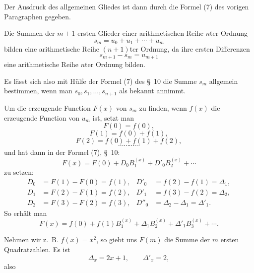 

Der Ausdruck des allgemeinen Gliedes ist dann durch die Formel (7) des vorigen Paragraphen gegeben.

Die Summen der \(m+1\) ersten Glieder einer arithmetischen Reihe \(n\)ter Ordnung
\[
s_m=u_0+u_1+\cdots+u_m
\]
bilden eine arithmetische Reihe \((n+1)\)ter Ordnung, da ihre ersten Differenzen
\[
s_{m+1}-s_m=u_{m+1}
\]
eine arithmetische Reihe \(n\)ter Ordnung bilden.

Es lässt sich also mit Hülfe der Formel (7) des \S~10 die Summe \(s_m\) allgemein bestimmen, wenn man \(s_0,s_1,\ldots,s_{n+1}\) als bekannt annimmt.

Um die erzeugende Function \(F(x)\) von \(s_m\) zu finden, wenn \(f(x)\) die erzeugende Function von \(u_m\) ist, setzt man
\[
F(0)=f(0),
\]
\[
F(1)=f(0)+f(1),
\]
\[
F(2)=f(0)+f(1)+f(2),
\]
\[
\cdots\cdots\cdots\cdots
\]
und hat dann in der Formel (7), \S~10:
\[
F(x)=F(0)+D_0B_1^{(x)}+D'_0B_2^{(x)}+\cdots
\]
zu setzen:
\[
\begin{aligned}
D_0&=F(1)-F(0)=f(1),&
D'_0&=f(2)-f(1)=\Delta_1,\\
D_1&=F(2)-F(1)=f(2),&
D'_1&=f(3)-f(2)=\Delta_2,\\
D_2&=F(3)-F(2)=f(3),&
D''_0&=\Delta_2-\Delta_1=\Delta'_1.
\end{aligned}
\]
So erhält man
\begin{equation}
F(x)=f(0)+f(1)B_1^{(x)}+\Delta_1B_2^{(x)}+\Delta'_1B_3^{(x)}+\cdots.
\tag{4}
\end{equation}

Nehmen wir z.\ B. \(f(x)=x^2\), so giebt uns \(F(m)\) die Summe der \(m\) ersten Quadratzahlen. Es ist
\[
\Delta_x=2x+1,\qquad \Delta'_x=2,
\]
also

